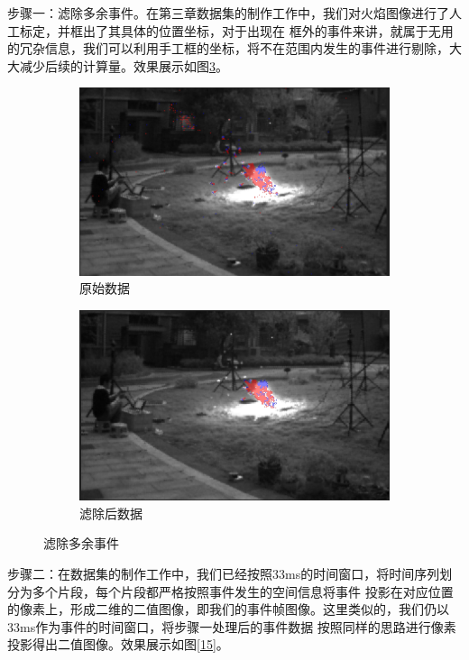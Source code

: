 步骤一：滤除多余事件。在第三章数据集的制作工作中，我们对火焰图像进行了人工标定，并框出了其具体的位置坐标，对于出现在
框外的事件来讲，就属于无用的冗杂信息，我们可以利用手工框的坐标，将不在范围内发生的事件进行剔除，大大减少后续的计算量。效果展示如图\ref{14}。
\begin{figure}[ht]
    \centering
    \begin{subfigure}{0.49\textwidth}
        \centering
        \includegraphics[width=\textwidth]{figures/extract_process_01.png}
        \caption{原始数据}
        \label{14.a}
    \end{subfigure}
    \hfill
    \begin{subfigure}{0.49\textwidth}
        \centering
        \includegraphics[width=\textwidth]{figures/extract_process_02.png}
        \caption{滤除后数据}
        \label{14.b}
    \end{subfigure}
    \caption{滤除多余事件}
    \label{14}
\end{figure}

步骤二：在数据集的制作工作中，我们已经按照33ms的时间窗口，将时间序列划分为多个片段，每个片段都严格按照事件发生的空间信息将事件
投影在对应位置的像素上，形成二维的二值图像，即我们的事件帧图像。这里类似的，我们仍以33ms作为事件的时间窗口，将步骤一处理后的事件数据
按照同样的思路进行像素投影得出二值图像。效果展示如图\ref{15}。

